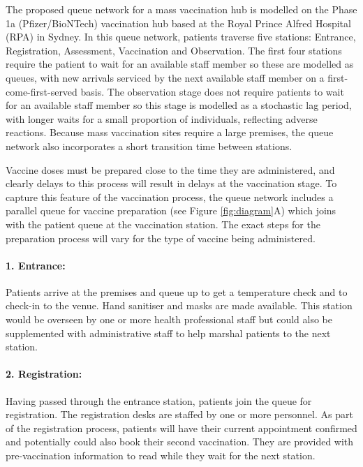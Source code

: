 \documentclass{article}
\begin{document}
The proposed queue network for a mass vaccination hub is modelled on the
Phase 1a (Pfizer/BioNTech) vaccination hub based at the Royal Prince
Alfred Hospital (RPA) in Sydney. In this queue network, patients
traverse five stations: Entrance, Registration, Assessment, Vaccination
and Observation. The first four stations require the patient to wait for
an available staff member so these are modelled as queues, with new
arrivals serviced by the next available staff member on a
first-come-first-served basis. The observation stage does not require
patients to wait for an available staff member so this stage is modelled
as a stochastic lag period, with longer waits for a small proportion of
individuals, reflecting adverse reactions. Because mass vaccination
sites require a large premises, the queue network also incorporates a
short transition time between stations.

Vaccine doses must be prepared close to the time they are administered,
and clearly delays to this process will result in delays at the
vaccination stage. To capture this feature of the vaccination process,
the queue network includes a parallel queue for vaccine preparation (see
Figure \ref{fig:diagram}A) which joins with the patient queue at the
vaccination station. The exact steps for the preparation process will
vary for the type of vaccine being administered.

\hypertarget{entrance}{%
\paragraph{1. Entrance:}\label{entrance}}

Patients arrive at the premises and queue up to get a temperature check
and to check-in to the venue. Hand sanitiser and masks are made
available. This station would be overseen by one or more health
professional staff but could also be supplemented with administrative
staff to help marshal patients to the next station.

\hypertarget{registration}{%
\paragraph{2. Registration:}\label{registration}}

Having passed through the entrance station, patients join the queue for
registration. The registration desks are staffed by one or more
personnel. As part of the registration process, patients will have their
current appointment confirmed and potentially could also book their
second vaccination. They are provided with pre-vaccination information
to read while they wait for the next station.
\end{document}
